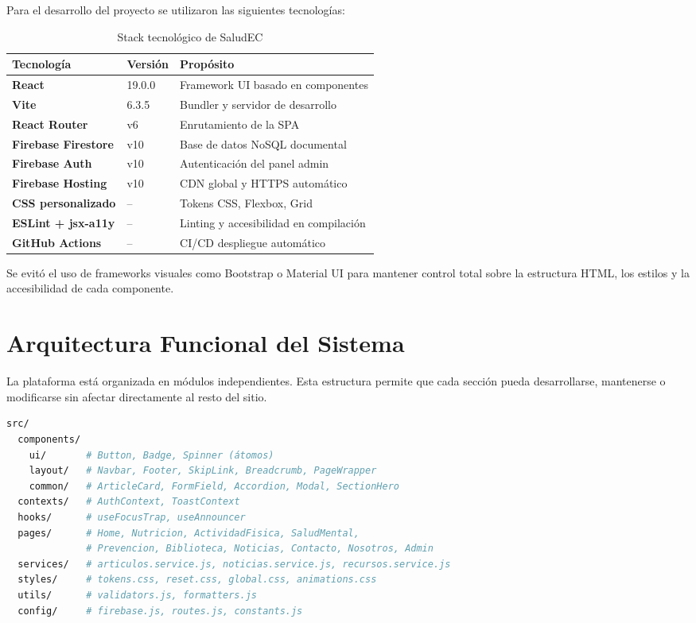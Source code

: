 \documentclass[12pt, a4paper]{article}
\begin{document}
Para el desarrollo del proyecto se utilizaron las siguientes tecnologías:

\begin{table}[H]
\centering
\caption{Stack tecnológico de SaludEC}
\small
\begin{tabular}{@{}>{\bfseries}p{4cm} p{4cm} p{5.5cm}@{}}
\toprule
\rowcolor{royalblue!12}
\textbf{Tecnología} & \textbf{Versión} & \textbf{Propósito} \\
\midrule
React          & 19.0.0   & Framework UI basado en componentes \\
Vite           & 6.3.5    & Bundler y servidor de desarrollo \\
React Router   & v6       & Enrutamiento de la SPA \\
Firebase Firestore & v10  & Base de datos NoSQL documental \\
Firebase Auth  & v10      & Autenticación del panel admin \\
Firebase Hosting & v10   & CDN global y HTTPS automático \\
CSS personalizado & --    & Tokens CSS, Flexbox, Grid \\
ESLint + jsx-a11y & --   & Linting y accesibilidad en compilación \\
GitHub Actions & --       & CI/CD despliegue automático \\
\bottomrule
\end{tabular}
\end{table}

Se evitó el uso de frameworks visuales como Bootstrap o Material UI para mantener control total sobre la estructura HTML, los estilos y la accesibilidad de cada componente.

\section{Arquitectura Funcional del Sistema}

La plataforma está organizada en módulos independientes. Esta estructura permite que cada sección pueda desarrollarse, mantenerse o modificarse sin afectar directamente al resto del sitio.

\begin{lstlisting}[language=bash, caption={Estructura de directorios de src/}]
src/
  components/
    ui/       # Button, Badge, Spinner (átomos)
    layout/   # Navbar, Footer, SkipLink, Breadcrumb, PageWrapper
    common/   # ArticleCard, FormField, Accordion, Modal, SectionHero
  contexts/   # AuthContext, ToastContext
  hooks/      # useFocusTrap, useAnnouncer
  pages/      # Home, Nutricion, ActividadFisica, SaludMental,
              # Prevencion, Biblioteca, Noticias, Contacto, Nosotros, Admin
  services/   # articulos.service.js, noticias.service.js, recursos.service.js
  styles/     # tokens.css, reset.css, global.css, animations.css
  utils/      # validators.js, formatters.js
  config/     # firebase.js, routes.js, constants.js
\end{lstlisting}
\end{document}
